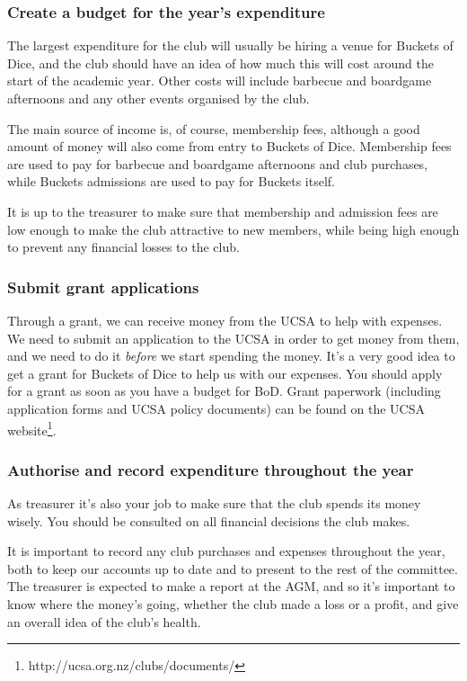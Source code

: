 \subsubsection{Create a budget for the year's expenditure}

The largest expenditure for the club will usually be hiring a venue for Buckets of Dice, and the club should have an idea of how much this will cost around the start of the academic year. Other costs will include barbecue and boardgame afternoons and any other events organised by the club.

The main source of income is, of course, membership fees, although a good amount of money will also come from entry to Buckets of Dice. Membership fees are used to pay for barbecue and boardgame afternoons and club purchases, while Buckets admissions are used to pay for Buckets itself.

It is up to the treasurer to make sure that membership and admission fees are low enough to make the club attractive to new members, while being high enough to prevent any financial losses to the club.

\subsubsection{Submit grant applications}

Through a grant, we can receive money from the UCSA to help with expenses. We need to submit an application to the UCSA in order to get money from them, and we need to do it \textit{before} we start spending the money. It's a very good idea to get a grant for Buckets of Dice to help us with our expenses. You should apply for a grant as soon as you have a budget for BoD. Grant paperwork (including application forms and UCSA policy documents) can be found on the UCSA website\footnote{http://ucsa.org.nz/clubs/documents/}.

\subsubsection{Authorise and record expenditure throughout the year}

As treasurer it's also your job to make sure that the club spends its money wisely. You should be consulted on all financial decisions the club makes.

It is important to record any club purchases and expenses throughout the year, both to keep our accounts up to date and to present to the rest of the committee. The treasurer is expected to make a report at the AGM, and so it's important to know where the money's going, whether the club made a loss or a profit, and give an overall idea of the club's health.

